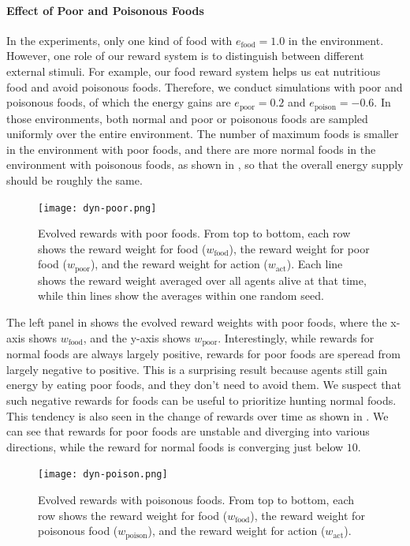 \paragraph{Effect of Poor and Poisonous Foods}
In the experiments, only one kind of food with $e_{\mathrm{food}} = 1.0$ in the environment. However, one role of our reward system is to distinguish between different external stimuli. For example, our food reward system helps us eat nutritious food and avoid poisonous foods. Therefore, we conduct simulations with poor and poisonous foods, of which the energy gains are $e_{\mathrm{poor}} = 0.2$ and $e_{\mathrm{poison}} = -0.6$. In those environments, both normal and poor or poisonous foods are sampled uniformly over the entire environment. The number of maximum foods is smaller in the environment with poor foods, and there are more normal foods in the environment with poisonous foods, as shown in , so that the overall energy supply should be roughly the same.

\begin{figure}[t]
  \centering
  \texttt{[image: dyn-poor.png]}
  \caption{
    Evolved rewards with poor foods.
    From top to bottom, each row shows the reward weight for food ($w_{\mathrm{food}}$), the reward weight for poor food ($w_{\mathrm{poor}}$), and the reward weight for action ($w_{\mathrm{act}}$).
    Each line shows the reward weight averaged over all agents alive at that time, while thin lines show the averages within one random seed.
  }\label{figure:result-dyn-poor}
\end{figure}

The left panel in  shows the evolved reward weights with poor foods, where the x-axis shows $w_{\mathrm{food}}$, and the y-axis shows $w_{\mathrm{poor}}$. Interestingly, while rewards for normal foods are always largely positive, rewards for poor foods are speread from largely negative to positive. This is a surprising result because agents still gain energy by eating poor foods, and they don't need to avoid them. We suspect that such negative rewards for foods can be useful to prioritize hunting normal foods. This tendency is also seen in the change of rewards over time as shown in . We can see that rewards for poor foods are unstable and diverging into various directions, while the reward for normal foods is converging just below $10$.

\begin{figure}[t]
  \centering
  \texttt{[image: dyn-poison.png]}
  \caption{
    Evolved rewards with poisonous foods.
    From top to bottom, each row shows the reward weight for food ($w_{\mathrm{food}}$), the reward weight for poisonous food ($w_{\mathrm{poison}}$), and the reward weight for action ($w_{\mathrm{act}}$).
  }\label{figure:result-dyn-poison}
\end{figure}


